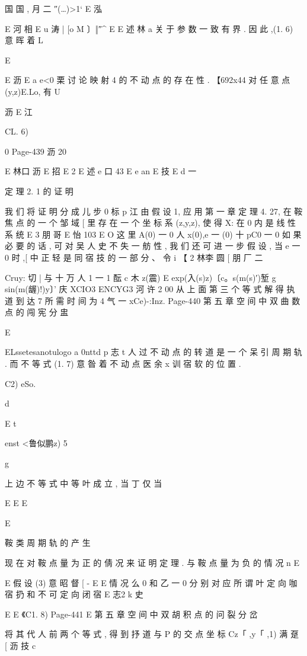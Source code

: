 {{{{{{{国 国 ,
月 二 ″(…)>1` E 泓

E 河
相 E
u 涛 | [o M 〕‖″^
E
E 述 林 a
关 于 参 数 一 致 有 界 . 因 此 ,(1. 6) 意 晖 着
L

E

E 沥 E a
e<0 栗 讨 论 映 射 4 的 不 动 点 的 存 在 性 .
【692x44
对 任 意 点 (y,z)E.Lo, 有
U

沥
E 江

CL. 6)

0
Page-439
沥 20

E 林口 沥
E 招
E 2
E 述 e 口 43
E e an
E 技
E d 一

定 理 2. 1 的 证 明

我 们 将 证 明 分 成 儿 步
0 标 p 江
由 假 设 1, 应 用 第 一 章 定 理 4. 27, 在 鞍 焦 点 的 一 个 邹 域 [ 里 存
在 一 个 坐 标 系 (z,y,z), 使 得 X: 在 0 内 是 线 性 系 统
E 3 朋
哥 E 怡 103 E
O
这 里 A(0) 一 0 人 x(0),e 一 (0) 十 pC0 一 0 如 果 必 要 的 话 , 可 对
吴
人 史 不 失 一 舫 性 , 我 们 还 可 进 一 步 假 设 , 当 e 一 0 时 ,[ 中 正 轻 是
同 宿 技 的 一 部 分 、 令
i
【 2 林李 圆 [ 朋
厂 二 {Cruy: 切 | 与 十 万 人 1 一 1
酝 c 木
z(震) E exp(入(s)z)〔c。s(m(s)′)堑 g sin(m(龌)!)y〕'
庆 XCIO3 ENCYG3 河 许 2
00
从 上 面 第 三 个 等 式 解 得 执 道 到 达 7 所 需 时 间 为 4 气 一 xCe)-:Inz.
Page-440
第 五 章 空 间 中 双 曲 数 点 的 闯 宪 分 盅

E

ELssetesanotulogo a
0nttd p 志 t 人
过 不 动 点 的 转 道 是 一 个 呆 引 周 期 轨 . 而 不 等 式 (1. 7) 意 昝 着 不 动 点
医 余 x 训
宿 软 的 位 置 .

C2) eSo.

d

E t

enst <鲁似鹏z) 5

g

上 边 不 等 式 中 等 叶 成 立 , 当 丁 仅 当

E
E
E

E

鞍 类 周 期 轨 的 产 生

现 在 对 鞍 点 量 为 正 的 倩 况 来 证 明 定 理 . 与 鞍 点 量 为 负 的 情 况
n
E

E
假 设 (3) 意 昭 督
[
- E E
情 况 么 0 和 乙 一 0 分 别 对 应 所 谓 叶 定 向 咖 宿 扔 和 不 可 定 向 闭 宿
E 志2 k 史

E E 《C1. 8)
Page-441
E 第 五 章 空 间 中 双 胡 积 点 的 问 裂 分 岔

将 其 代 人 前 两 个 等 式 , 得 到 抒 道 与 P 的 交 点 坐 标 Cz「 ,y「 ,1) 满 趸
[ 沥 技 c

}}}}}}}}
